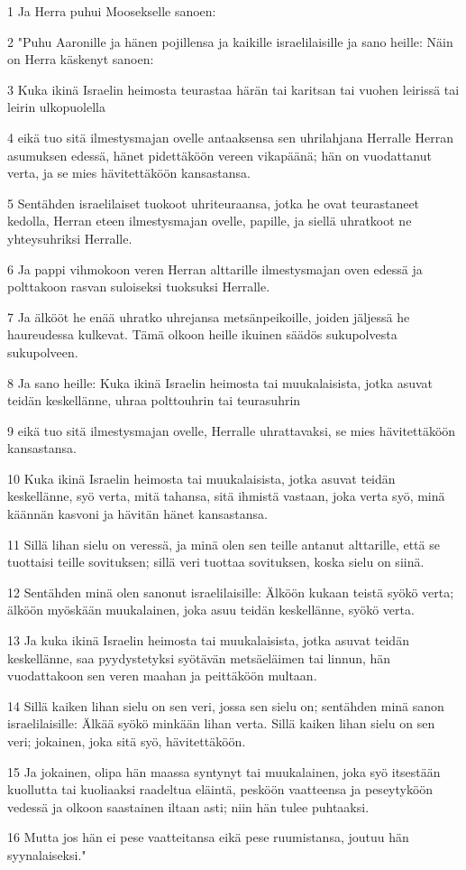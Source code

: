 \par 1 Ja Herra puhui Moosekselle sanoen:
\par 2 "Puhu Aaronille ja hänen pojillensa ja kaikille israelilaisille ja sano heille: Näin on Herra käskenyt sanoen:
\par 3 Kuka ikinä Israelin heimosta teurastaa härän tai karitsan tai vuohen leirissä tai leirin ulkopuolella
\par 4 eikä tuo sitä ilmestysmajan ovelle antaaksensa sen uhrilahjana Herralle Herran asumuksen edessä, hänet pidettäköön vereen vikapäänä; hän on vuodattanut verta, ja se mies hävitettäköön kansastansa.
\par 5 Sentähden israelilaiset tuokoot uhriteuraansa, jotka he ovat teurastaneet kedolla, Herran eteen ilmestysmajan ovelle, papille, ja siellä uhratkoot ne yhteysuhriksi Herralle.
\par 6 Ja pappi vihmokoon veren Herran alttarille ilmestysmajan oven edessä ja polttakoon rasvan suloiseksi tuoksuksi Herralle.
\par 7 Ja älkööt he enää uhratko uhrejansa metsänpeikoille, joiden jäljessä he haureudessa kulkevat. Tämä olkoon heille ikuinen säädös sukupolvesta sukupolveen.
\par 8 Ja sano heille: Kuka ikinä Israelin heimosta tai muukalaisista, jotka asuvat teidän keskellänne, uhraa polttouhrin tai teurasuhrin
\par 9 eikä tuo sitä ilmestysmajan ovelle, Herralle uhrattavaksi, se mies hävitettäköön kansastansa.
\par 10 Kuka ikinä Israelin heimosta tai muukalaisista, jotka asuvat teidän keskellänne, syö verta, mitä tahansa, sitä ihmistä vastaan, joka verta syö, minä käännän kasvoni ja hävitän hänet kansastansa.
\par 11 Sillä lihan sielu on veressä, ja minä olen sen teille antanut alttarille, että se tuottaisi teille sovituksen; sillä veri tuottaa sovituksen, koska sielu on siinä.
\par 12 Sentähden minä olen sanonut israelilaisille: Älköön kukaan teistä syökö verta; älköön myöskään muukalainen, joka asuu teidän keskellänne, syökö verta.
\par 13 Ja kuka ikinä Israelin heimosta tai muukalaisista, jotka asuvat teidän keskellänne, saa pyydystetyksi syötävän metsäeläimen tai linnun, hän vuodattakoon sen veren maahan ja peittäköön multaan.
\par 14 Sillä kaiken lihan sielu on sen veri, jossa sen sielu on; sentähden minä sanon israelilaisille: Älkää syökö minkään lihan verta. Sillä kaiken lihan sielu on sen veri; jokainen, joka sitä syö, hävitettäköön.
\par 15 Ja jokainen, olipa hän maassa syntynyt tai muukalainen, joka syö itsestään kuollutta tai kuoliaaksi raadeltua eläintä, pesköön vaatteensa ja peseytyköön vedessä ja olkoon saastainen iltaan asti; niin hän tulee puhtaaksi.
\par 16 Mutta jos hän ei pese vaatteitansa eikä pese ruumistansa, joutuu hän syynalaiseksi."

